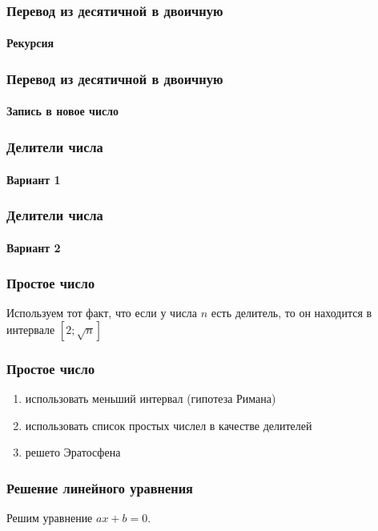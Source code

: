 \begin{frame}[fragile]
\frametitle{Перевод из десятичной в двоичную}
\framesubtitle{Рекурсия}



    
\end{frame}

\begin{frame}[fragile]
\frametitle{Перевод из десятичной в двоичную}
\framesubtitle{Запись в новое число}



    
\end{frame}


\begin{frame}[fragile]
\frametitle{Делители числа}
\framesubtitle{Вариант 1}


    
\end{frame}

\begin{frame}[fragile]
\frametitle{Делители числа}
\framesubtitle{Вариант 2}


    
\end{frame}

\begin{frame}[fragile]
\frametitle{Простое число}
Используем тот факт, что если у числа $n$ есть делитель, то он находится в интервале $[2;\sqrt{n}]$


    
\end{frame}

\begin{frame}[fragile]
\frametitle{Простое число}

\begin{enumerate}
 \item использовать меньший интервал (гипотеза Римана)
 \item использовать список простых числел в качестве делителей
 \item решето Эратосфена
\end{enumerate}

    
\end{frame}

\begin{frame}[fragile]
\frametitle{Решение линейного уравнения}

Решим уравнение $ax+b=0$.


    
\end{frame}

